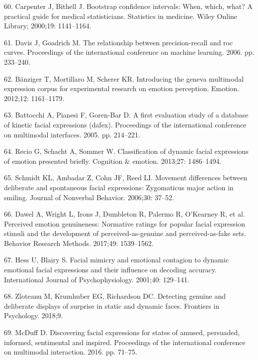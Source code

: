 \documentclass[10pt,letterpaper]{article}
\begin{document}
\leavevmode\hypertarget{ref-carpenter2000bootstrap}{}%
60. Carpenter J, Bithell J. Bootstrap confidence intervals: When, which, what? A practical guide for medical statisticians. Statistics in medicine. Wiley Online Library; 2000;19: 1141--1164.

\leavevmode\hypertarget{ref-davis2006relationship}{}%
61. Davis J, Goadrich M. The relationship between precision-recall and roc curves. Proceedings of the international conference on machine learning. 2006. pp. 233--240.

\leavevmode\hypertarget{ref-banziger2012introducing}{}%
62. Bänziger T, Mortillaro M, Scherer KR. Introducing the geneva multimodal expression corpus for experimental research on emotion perception. Emotion. 2012;12: 1161--1179.

\leavevmode\hypertarget{ref-battocchi2005first}{}%
63. Battocchi A, Pianesi F, Goren-Bar D. A first evaluation study of a database of kinetic facial expressions (dafex). Proceedings of the international conference on multimodal interfaces. 2005. pp. 214--221.

\leavevmode\hypertarget{ref-recio2013classification}{}%
64. Recio G, Schacht A, Sommer W. Classification of dynamic facial expressions of emotion presented briefly. Cognition \& emotion. 2013;27: 1486--1494.

\leavevmode\hypertarget{ref-schmidt2006movement}{}%
65. Schmidt KL, Ambadar Z, Cohn JF, Reed LI. Movement differences between deliberate and spontaneous facial expressions: Zygomaticus major action in smiling. Journal of Nonverbal Behavior. 2006;30: 37--52.

\leavevmode\hypertarget{ref-dawel2017perceived}{}%
66. Dawel A, Wright L, Irons J, Dumbleton R, Palermo R, O'Kearney R, et al. Perceived emotion genuineness: Normative ratings for popular facial expression stimuli and the development of perceived-as-genuine and perceived-as-fake sets. Behavior Research Methods. 2017;49: 1539--1562.

\leavevmode\hypertarget{ref-hess2001facial}{}%
67. Hess U, Blairy S. Facial mimicry and emotional contagion to dynamic emotional facial expressions and their influence on decoding accuracy. International Journal of Psychophysiology. 2001;40: 129--141.

\leavevmode\hypertarget{ref-zloteanu2018detecting}{}%
68. Zloteanu M, Krumhuber EG, Richardson DC. Detecting genuine and deliberate displays of surprise in static and dynamic faces. Frontiers in Psychology. 2018;9.

\leavevmode\hypertarget{ref-mcduff2016discovering}{}%
69. McDuff D. Discovering facial expressions for states of amused, persuaded, informed, sentimental and inspired. Proceedings of the international conference on multimodal interaction. 2016. pp. 71--75.
\end{document}
